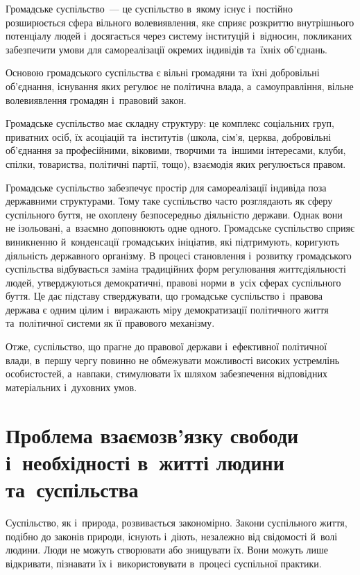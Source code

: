 \documentclass[a5paper,oneside,DIV=12,12pt,headings=small]{scrartcl}
\begin{document}
		Громадське суспільство~— це суспільство в~якому існує і~постійно розширюється сфера вільного волевиявлення, яке сприяє розкриттю внутрішнього потенціалу людей і~досягається через систему інституцій і~відносин, покликаних забезпечити умови для самореалізації окремих індивідів та~їхніх об'єднань.
		
		Основою громадського суспільства є вільні громадяни та~їхні добровільні об'єднання, існування яких регулює не політична влада, а~самоуправління, вільне волевиявлення громадян і~правовий закон.
		
		Громадське суспільство має складну структуру: це комплекс соціальних груп, приватних осіб, їх асоціацій та~інститутів (школа, сім'я, церква, добровільні об'єднання за професійними, віковими, творчими та~іншими інтересами, клуби, спілки, товариства, політичні партії, тощо), взаємодія яких регулюється правом.
		
		Громадське суспільство забезпечує простір для самореалізації індивіда поза державними структурами. Тому таке суспільство часто розглядають як сферу суспільного буття, не охоплену безпосередньо діяльністю держави. Однак вони не ізольовані, а~взаємно доповнюють одне одного. Громадське суспільство сприяє виникненню й~конденсації громадських ініціатив, які підтримують, коригують діяльність державного організму. В процесі становлення і~розвитку громадського суспільства відбувається заміна традиційних форм регулювання життєдіяльності людей, утверджуються демократичні, правові норми в~усіх сферах суспільного буття. Це дає підставу стверджувати, що громадське суспільство і~правова держава є одним цілим і~виражають міру демократизації політичного життя та~політичної системи як її правового механізму.
		
		Отже, суспільство, що прагне до правової держави і~ефективної політичної влади, в~першу чергу повинно не обмежувати можливості високих устремлінь особистостей, а~навпаки, стимулювати їх шляхом забезпечення відповідних матеріальних і~духовних умов.

	\section{Проблема взаємозв'язку свободи і~необхідності в~житті людини та~суспільства}
		Суспільство, як і~природа, розвивається закономірно. Закони суспільного життя, подібно до законів природи, існують і~діють, незалежно від свідомості й~волі людини. Люди не можуть створювати або знищувати їх. Вони можуть лише відкривати, пізнавати їх і~використовувати в~процесі суспільної практики.
		
\end{document}
